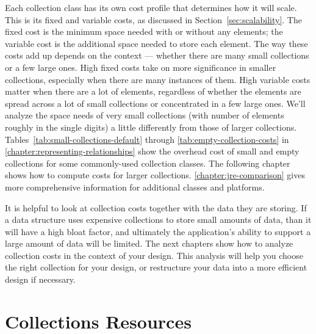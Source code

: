 Each collection class has its own cost
profile that determines how it will scale. This is its fixed
and variable costs, as discussed in Section~\ref{sec:scalability}. 
The fixed cost is the minimum space needed with or
without any elements; the variable cost is the additional space needed to
store each element. The way these costs add up
depends on the context ---
whether there are many small collections or a few large ones. 
High fixed costs take on more significance in smaller collections,
especially when there are many instances of them. High variable costs matter
when there are a lot of elements, regardless of whether the elements are spread across
a lot of small collections or concentrated in a few large ones.
We'll analyze the space needs of very small collections (with number of elements
roughly in the single digits) a little differently from those of larger
collections.
Tables~\ref{tab:small-collections-default} through \ref{tab:empty-collection-costs} in
\autoref{chapter:representing-relationships} show the overhead cost of small and empty collections for some commonly-used
collection classes. The following chapter shows
how to compute costs for larger collections.
\autoref{chapter:jre-comparison} gives more comprehensive information for
additional classes and platforms.





It is helpful to look at collection costs 
together with the data they are storing. If a data structure uses expensive collections
to store small amounts of data, than it
will have a high bloat factor, and ultimately the application's ability to
support a large amount of data will be limited. The next chapters show
how to analyze collection costs in the context of your design.
This analysis will help you choose the right collection for your design, or
restructure your data into a more efficient design if necessary.


\section{Collections Resources}

